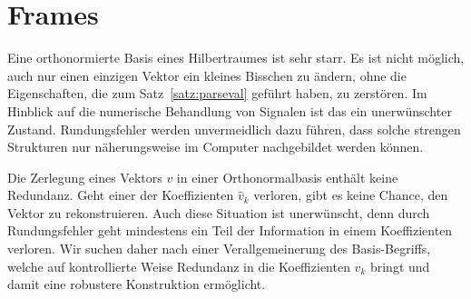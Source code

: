 %
%
%
\section{Frames
\label{section:frames}}
Eine orthonormierte Basis eines Hilbertraumes ist sehr starr.
Es ist nicht möglich, auch nur einen einzigen Vektor ein kleines
Bisschen zu ändern, ohne die Eigenschaften, die zum Satz~\ref{satz:parseval}
geführt haben, zu zerstören.
Im Hinblick auf die numerische Behandlung von Signalen ist das
ein unerwünschter Zustand.
Rundungsfehler werden unvermeidlich dazu führen, dass solche strengen
Strukturen nur näherungsweise im Computer nachgebildet werden 
können.

Die Zerlegung eines Vektors $v$ in einer Orthonormalbasis enthält keine
Redundanz.
Geht einer der Koeffizienten $\hat{v}_k$ verloren, gibt es keine
Chance, den Vektor zu rekonstruieren.
Auch diese Situation ist unerwünscht, denn durch Rundungsfehler geht
mindestens ein Teil der Information in einem Koeffizienten verloren.
Wir suchen daher nach einer Verallgemeinerung des Basis-Begriffs, welche
auf kontrollierte Weise Redundanz in die Koeffizienten $\hat{v}_k$
bringt und damit eine robustere Konstruktion ermöglicht.

%
%
